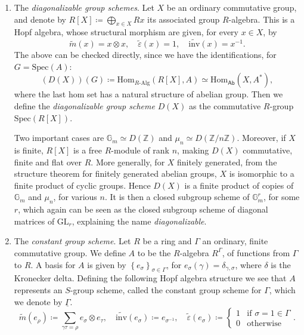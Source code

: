 \begin{ex}
\begin{enumerate}
		\item The {\em diagonalizable group schemes}. Let $X$ be an ordinary
			commutative group, and denote by $R[X] \coloneqq \bigoplus_{x \in X} Rx$
			its associated group $R$-algebra.
			This is a Hopf algebra, whose structural morphism
			are given, for every $x \in X$, by
			\begin{equation*}
				\widetilde{m}(x) = x \otimes x,
				\quad
				\widetilde{\varepsilon}(x) = 1,
				\quad
				\widetilde{\mathrm{inv}}(x) = x^{-1}
			.\end{equation*} 
			The above can be checked directly, since we have
			the identifications, for $G = \mathrm{Spec}(A)$:
			\begin{equation*}
				\left( D(X) \right)(G) \coloneqq
				\mathrm{Hom}_{R \text{-Alg}} \left( R[X], A \right) \simeq
				\mathrm{Hom}_{\mathsf{Ab}} \left( X, A^* \right)
			,\end{equation*} 
			where the last hom set has a natural structure of abelian
			group.
			Then we define the {\em diagonalizable group scheme} $D(X)$
			as the commutative $R$-group $\mathrm{Spec}(R[X])$.

			Two important cases are $\mathbb{G}_m \simeq D(\mathbb{Z})$
			and $\mu_n \simeq D(\mathbb{Z}/n\mathbb{Z})$.
			Moreover, if $X$ is finite, $R[X]$ is a free $R$-module of rank $n$,
			making $D(X)$ commutative, finite and flat over $R$.
			More generally, for $X$ finitely generated, 
			from the structure theorem for finitely generated abelian groups, 
			$X$ is isomorphic to a finite product of cyclic groups.
			Hence $D(X)$ is a finite product of copies of $\mathbb{G}_m$
			and $\mu_n$, for various $n$.
			It is then a closed subgroup scheme of $\mathbb{G}_m^r$, for some $r$,
			which again can be seen as the closed subgroup scheme of diagonal
			matrices of $\mathrm{GL}_r$, explaining the name 
			{\em diagonalizable}.


		\item The {\em constant group scheme}\label{ex:ConstantGroups}.
			Let $R$ be a ring and $\Gamma$ an ordinary, finite commutative group.
			We define $A$ to be the $R$-algebra $R^\Gamma$,
			of functions from $\Gamma$ to $R$.
			A basis for $A$ is given by $\left\{ e_\sigma \right\}_{\sigma \in \Gamma}$,
			for $e_\sigma(\gamma) = \delta_{\gamma,\sigma}$,
			where $\delta$ is the Kronecker delta.
			Defining the following Hopf algebra structure
			we see that $A$ represents an $S$-group scheme,
			called the constant group scheme for $\Gamma$,
			which we denote by $\underline{\Gamma}$.
			\begin{equation*}
				\widetilde{m}(e_\rho) \coloneqq
				\sum_{\gamma\tau = \rho}^{} e_\sigma \otimes e_\tau, 
				\quad
				\widetilde{\mathrm{inv}}(e_\sigma) \coloneqq e_{\sigma^{-1}}, 
				\quad
				\widetilde{\varepsilon}(e_\sigma) \coloneqq
				\begin{cases}
					1 & \text{if } \sigma = 1 \in \Gamma\\
					0 & \text{otherwise}
				\end{cases}.
			\end{equation*}



\end{enumerate}
\end{ex}
